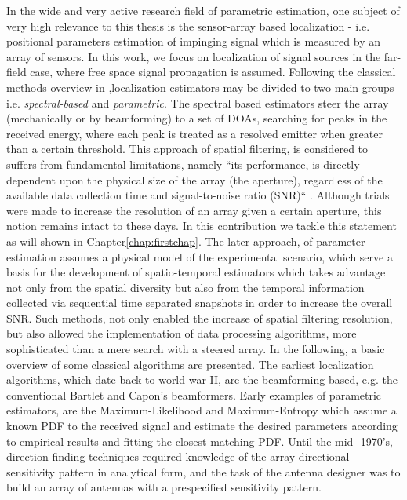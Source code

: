 In the wide and very active research field of parametric estimation, one subject of very high relevance to this thesis is the sensor-array based localization - i.e. positional parameters estimation of impinging signal which is measured by an array of sensors.
In this work, we focus on localization of signal sources in the far-field case, where free space signal propagation is assumed.
Following the classical methods overview in \cite{krim1996two},localization estimators may be divided to two main groups - i.e. \textit{spectral-based} and \textit{parametric}.
The spectral based estimators steer the array (mechanically or by beamforming) to a set of DOAs, searching for peaks in the received energy, where each peak is treated as a resolved emitter when greater than a certain threshold.
This approach of spatial filtering, is considered to suffers from fundamental
limitations, namely ``its performance, is directly dependent upon the physical size of the array (the aperture), regardless of the available data collection time and signal-to-noise ratio (SNR)`` \cite{krim1996two}.
Although trials were made to increase the resolution of an array given a certain aperture, this notion remains intact to these days.
In this contribution we tackle this statement as will shown in Chapter\ref{chap:firstchap}.
The later approach, of parameter estimation assumes a physical model of the experimental scenario, which serve a basis for the development of spatio-temporal estimators which takes advantage not only from the spatial diversity but also from the temporal information collected via sequential time separated snapshots in order to increase the overall SNR.
Such methods, not only enabled the increase of spatial filtering resolution, but also allowed the implementation of data processing algorithms, more sophisticated than a mere search with a steered array.
In the following, a basic overview of some classical algorithms are presented.
The earliest localization algorithms, which date back to world war II, are the beamforming based, e.g. the conventional Bartlet \cite{van2004optimum} and Capon's \cite{capon1969high} beamformers.
Early examples of parametric estimators, are the Maximum-Likelihood \cite{macdonald1969optimum,schweppe1968sensor} and Maximum-Entropy \cite{ables1974maximum} which assume a known PDF to the received signal and estimate the desired parameters according to empirical results and fitting the closest matching PDF.
Until the mid- 1970's, direction finding techniques required knowledge of the array directional sensitivity pattern in analytical form, and the task of the antenna designer was to build an array of antennas with a prespecified sensitivity pattern.
